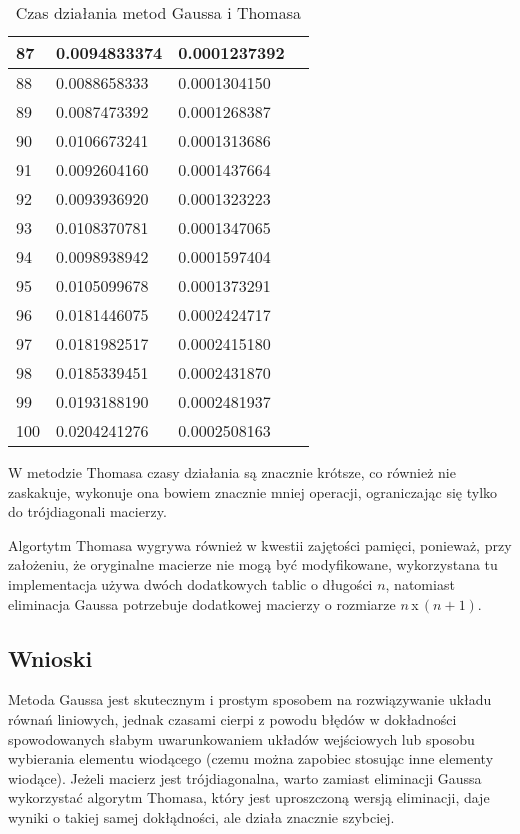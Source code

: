 \documentclass{article}
\begin{document}
\begin{table}[H]
{\begin{tabular}{|l|l|l|l|}
87 & 0.0094833374 & 0.0001237392 \\ \hline
88 & 0.0088658333 & 0.0001304150 \\ \hline
89 & 0.0087473392 & 0.0001268387 \\ \hline
90 & 0.0106673241 & 0.0001313686 \\ \hline
91 & 0.0092604160 & 0.0001437664 \\ \hline
92 & 0.0093936920 & 0.0001323223 \\ \hline
93 & 0.0108370781 & 0.0001347065 \\ \hline
94 & 0.0098938942 & 0.0001597404 \\ \hline
95 & 0.0105099678 & 0.0001373291 \\ \hline
96 & 0.0181446075 & 0.0002424717 \\ \hline
97 & 0.0181982517 & 0.0002415180 \\ \hline
98 & 0.0185339451 & 0.0002431870 \\ \hline
99 & 0.0193188190 & 0.0002481937 \\ \hline
100 & 0.0204241276 & 0.0002508163 \\ \hline
\end{tabular}
}
\caption{Czas działania metod Gaussa i Thomasa}
\end{table}

W metodzie Thomasa czasy działania są znacznie krótsze, co również nie zaskakuje, wykonuje ona bowiem znacznie mniej operacji, ograniczając
się tylko do trójdiagonali macierzy.

Algortytm Thomasa wygrywa również w kwestii zajętości pamięci, ponieważ, przy założeniu, że oryginalne macierze nie mogą być
modyfikowane, wykorzystana tu implementacja używa dwóch dodatkowych tablic o długości $n$, natomiast eliminacja Gaussa potrzebuje
dodatkowej macierzy o rozmiarze $n$\,x\,$(n+1)$.

\subsection{Wnioski}
Metoda Gaussa jest skutecznym i prostym sposobem na rozwiązywanie układu równań liniowych, jednak czasami cierpi z powodu 
błędów w dokładności spowodowanych słabym uwarunkowaniem układów wejściowych lub sposobu wybierania elementu wiodącego (czemu 
można zapobiec stosując inne elementy wiodące). Jeżeli macierz jest trójdiagonalna, warto zamiast 
eliminacji Gaussa wykorzystać algorytm Thomasa, który jest uproszczoną wersją eliminacji, daje wyniki o takiej samej dokłądności,
ale działa znacznie szybciej.
\end{document}
